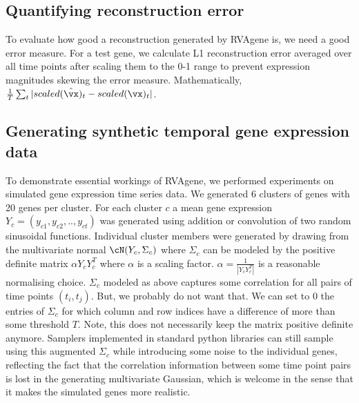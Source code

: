 \subsection{Quantifying reconstruction error}
To evaluate how good a reconstruction generated by RVAgene is, we need a good error measure. For a test gene, we calculate L1 reconstruction error averaged over all time points  after scaling them to the 0-1 range to prevent expression magnitudes skewing the error measure. Mathematically, $ \frac{1}{T}\sum_{t}|scaled(\hat{\vx})_t - scaled(\vx)_t| $.
\subsection{Generating synthetic temporal gene expression data} To demonstrate  essential workings of RVAgene, we performed experiments on simulated gene expression time series data. We generated 6 clusters of genes with 20 genes per cluster. For each cluster $c$ a mean gene expression $Y_c = (y_{c1},y_{c2},..,y_{ct})$ was generated using addition or convolution of two random sinusoidal functions. Individual cluster members were generated by drawing from the multivariate normal $\cN(Y_c,\Sigma_c)$ where $\Sigma_c$ can be modeled by the positive definite matrix $\alpha Y_cY_c^T$ where $\alpha$ is a scaling factor. $\alpha = \frac{1}{|Y_c Y_c^T|}$ is a reasonable normalising choice. $\Sigma_c$ modeled as above captures some correlation for all pairs of time points $(t_i,t_j)$. But, we probably do not want that. We can set to 0 the entries of $\Sigma_c$ for which column and row indices have a difference of more than some threshold $T$. Note, this does not necessarily keep the matrix positive definite anymore. Samplers implemented in standard python libraries can still sample using this augmented $\Sigma_c$ while introducing some noise to the individual genes, reflecting the fact that the correlation information between some time point pairs is lost in the generating multivariate Gaussian, which is welcome in the sense that it makes the simulated genes more realistic. 

